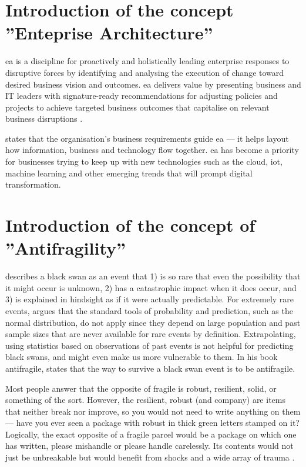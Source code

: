 \section{Introduction of the concept ''Enteprise Architecture''}
\label{introea}
\acrfull{ea} is a discipline for proactively and holistically leading enterprise responses to disruptive forces by identifying and analysing the execution of change toward desired business vision and outcomes. \acrshort{ea} delivers value by presenting business and IT leaders with signature-ready recommendations for adjusting policies and projects to achieve targeted business outcomes that capitalise on relevant business disruptions \parencite{Gartner}.\par
\textcite{White2018} states that the organisation’s business requirements guide \acrshort{ea} — it helps layout how information, business and technology flow together. \acrshort{ea} has become a priority for businesses trying to keep up with new technologies such as the cloud, \acrfull{iot}, machine learning and other emerging trends that will prompt digital transformation.

\section{Introduction of the concept of ''Antifragility''}
\label{sec:introantifragility}
\textcite{Taleb2008} describes a black swan as an event that 1) is so rare that even the possibility that it might occur is unknown, 2) has a catastrophic impact when it does occur, and 3) is explained in hindsight as if it were actually predictable. For extremely rare events, \citeauthor{Taleb2008} argues that the standard tools of probability and prediction, such as the normal distribution, do not apply since they depend on large population and past sample sizes that are never available for rare events by definition. Extrapolating, using statistics based on observations of past events is not helpful for predicting black swans, and might even make us more vulnerable to them. In his book \Gls{antifragile}, \textcite{Taleb2013} states that the way to survive a black swan event is to be \gls{antifragile}.\par
Most people answer that the opposite of \gls{fragile} is \gls{robust}, \gls{resilient}, solid, or something of the sort. However, the \gls{resilient}, \gls{robust} (and company) are items that neither break nor improve, so you would not need to write anything on them — have you ever seen a package with \gls{robust} in thick green letters stamped on it? Logically, the exact opposite of a \gls{fragile} parcel would be a package on which one has written, please mishandle or please handle carelessly. Its contents would not just be unbreakable but would benefit from shocks and a wide array of trauma \parencite{Taleb2013}.

